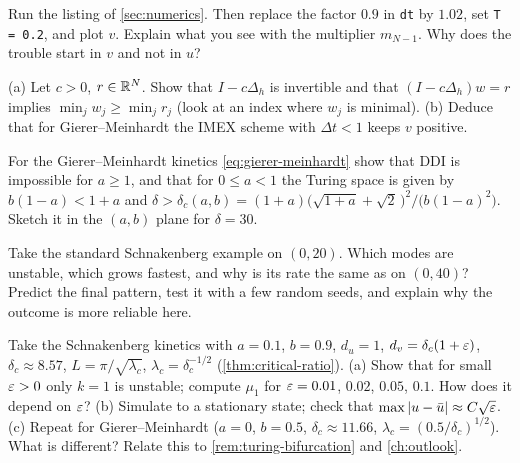 \begin{exercise}\label{exer:examples-step-restriction}
Run the listing of \cref{sec:numerics}. Then replace the factor $0.9$ in \texttt{dt} by
$1.02$, set \mbox{\texttt{T = 0.2}}, and plot $v$. Explain what you see with the multiplier
$m_{N-1}$. Why does the trouble start in $v$ and not in $u$?
\end{exercise}

\begin{exercise}\label{exer:examples-imex}
(a) Let $c>0$, $r\in\mathbb{R}^N$. Show that $I-c\Delta_h$ is invertible and that
$(I-c\Delta_h)w=r$ implies $\min_jw_j\ge\min_jr_j$ (look at an index where $w_j$ is
minimal). (b) Deduce that for Gierer--Meinhardt the IMEX scheme with $\Delta t<1$ keeps
$v$ positive.
\end{exercise}

\begin{exercise}\label{exer:examples-gm-space}
For the Gierer--Meinhardt kinetics \eqref{eq:gierer-meinhardt} show that DDI is
impossible for $a\ge1$, and that for $0\le a<1$ the Turing space is given by
$b(1-a)<1+a$ and $\delta>\delta_c(a,b)=(1+a)\big(\sqrt{1+a}+\sqrt2\,\big)^2/\big(b(1-a)^2\big)$.
Sketch it in the $(a,b)$ plane for $\delta=30$.
\end{exercise}

\begin{exercise}\label{exer:examples-l20}
Take the standard Schnakenberg example on $(0,20)$. Which modes are unstable, which
grows fastest, and why is its rate the same as on $(0,40)$? Predict the final pattern,
test it with a few random seeds, and explain why the outcome is more reliable here.
\end{exercise}

\begin{exercise}[$\ast$]\label{exer:examples-near-threshold}
Take the Schnakenberg kinetics with $a=0.1$, $b=0.9$, $d_u=1$, $d_v=\delta_c(1+\varepsilon)$,
$\delta_c\approx8.57$, $L=\pi/\sqrt{\lambda_c}$, $\lambda_c=\delta_c^{-1/2}$
(\cref{thm:critical-ratio}). (a) Show that for small $\varepsilon>0$ only $k=1$ is unstable;
compute $\mu_1$ for $\varepsilon=0.01$, $0.02$, $0.05$, $0.1$. How does it depend on $\varepsilon$?
(b) Simulate to a stationary state; check that $\max\left\lvert u-\bar u\right\rvert\approx C\sqrt{\varepsilon}$. (c) Repeat for Gierer--Meinhardt ($a=0$, $b=0.5$, $\delta_c\approx11.66$,
$\lambda_c=(0.5/\delta_c)^{1/2}$). What is different? Relate this to
\cref{rem:turing-bifurcation} and \cref{ch:outlook}.
\end{exercise}

